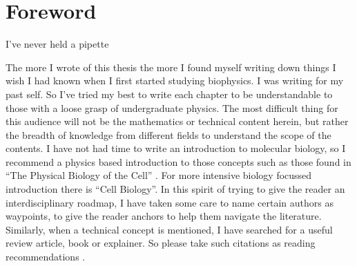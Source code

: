 \chapter*{Foreword}
\label{chap:foreword}
\begin{chapquote} {}
I've never held a pipette
\end{chapquote}

The more I wrote of this thesis the more I found myself writing down things I wish I had known when I first started studying biophysics. I was writing for my past self. So I've tried my best to write each chapter to be understandable to those with a loose grasp of undergraduate physics. The most difficult thing for this audience will not be the mathematics or technical content herein, but rather the breadth of knowledge from different fields to understand the scope of the contents. I have not had time to write an introduction to molecular biology, so I recommend a physics based introduction to those concepts such as those found in ``The Physical Biology of the Cell'' \cite{phillips2012}. For more intensive biology focussed introduction there is ``Cell Biology''\cite{pollard2016}. In this spirit of trying to give the reader an interdisciplinary roadmap, I have taken some care to name certain authors as waypoints, to give the reader anchors to help them navigate the literature. Similarly, when a technical concept is mentioned, I have searched for a useful review article, book or explainer. So please take such citations as reading recommendations \cite{dawkins1989, hofstadter1999}.


